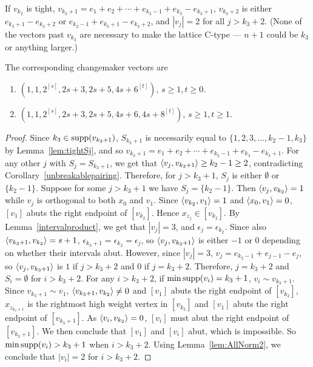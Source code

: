 \begin{prop}\label{2k2>2}
If $v_{k_2}$ is tight, $v_{k_3 + 1} = e_1 + e_2 + \cdots + e_{k_2 - 1} + e_{k_3} - e_{k_3 + 1}$, $v_{k_3 + 2}$ is either $e_{k_3 + 1} - e_{k_3+2}$ or $e_{k_2 - 1} +  e_{k_3 + 1} - e_{k_3+2}$, and $|v_j| = 2$ for all $j > k_3 + 2$. (None of the vectors past $v_{k_3}$ are necessary to make the lattice C-type --- $n+1$ could be $k_3$ or anything larger.)

The corresponding changemaker vectors are
\begin{enumerate}
\item $(1,1,2^{[s]},2s+3,2s+5,4s+6^{[t]})$, $s\ge1,t\ge0$.
\item $(1,1,2^{[s]},2s+3,2s+5,4s+6,4s+8^{[t]})$, $s\ge1,t\ge1$.
\end{enumerate}
\end{prop}
\begin{proof}
Since $k_3 \in \operatorname{supp}(v_{k_3 + 1})$, $S_{k_3 + 1}$ is necessarily equal to $\{1,2,3,\dots,k_2 - 1, k_3\}$ by Lemma~\ref{lem:tightSj}, and so $v_{k_3 + 1} = e_1 + e_2 + \cdots + e_{k_2 - 1} + e_{k_3} - e_{k_3 + 1}$. 
For any other $j$ with $S_j = S_{k_3 + 1}$, we get that $\left\langle v_j , v_{k_3+1} \right\rangle \ge k_2-1\ge2$, contradicting Corollary~\ref{unbreakablepairing}. Therefore, for $j > k_3 + 1$, $S_j$ is either $\emptyset$ or $\{k_2 - 1\}$. Suppose for some $j > k_3 + 1$ we have $S_j = \{k_2 - 1\}$. Then $\left\langle v_j , v_{k_2} \right\rangle = 1$ while $v_j$ is orthogonal to both $x_0$ and $v_1$. Since $\left\langle v_{k_2} , v_1 \right\rangle=1$ and $\left\langle x_0 , v_1 \right\rangle=0$, $[v_1]$ abuts the right endpoint of $[v_{k_2}]$. Hence $x_{z_j} \in [v_{k_2}]$.
By Lemma~\ref{intervalproduct}, we get that $|v_j| = 3$,  and $\epsilon_j = \epsilon_{k_2}$. Since also $\left\langle v_{k_3 +1} , v_{k_2} \right\rangle = s+1$, $\epsilon_{k_3 + 1} = \epsilon_{k_2} = \epsilon_j$, so $\left\langle v_j , v_{k_3 + 1} \right\rangle$ is either $-1$ or $0$ depending on whether their intervals abut. However, since $|v_j| = 3$, $v_j = e_{k_2 - 1} + e_{j-1} - e_j$, so $\left\langle v_j , v_{k_3 + 1} \right\rangle$ is $1$ if $j > k_3 + 2$ and $0$ if $j = k_3 + 2$. Therefore, $j = k_3 + 2$ and $S_i = \emptyset$ for $i > k_3 + 2$. 
For any $i > k_3 + 2$, if $\min\operatorname{supp}(v_i)=k_3+1$, $v_i\sim v_{k_3+1}$. Since $v_{k_3+1}\sim v_1$, $\left\langle v_{k_3+1} , v_{k_2} \right\rangle\ne0$ and $[v_1]$ abuts the right endpoint of $[v_{k_2}]$, $x_{z_{k_3+1}}$ is the rightmost high weight vertex in $[v_{k_2}]$ and $[v_1]$ abuts the right endpoint of  $[v_{k_3+1}]$. As $\left\langle v_i , v_{k_2} \right\rangle=0$, $[v_i]$ must abut the right endpoint of $[v_{k_3+1}]$. We then conclude that $[v_1]$ and $[v_i]$ abut, which is impossible.
 So $\min\operatorname{supp}(v_i)>k_3+1$ when $i > k_3 + 2$.
Using Lemma~\ref{lem:AllNorm2}, we conclude that $|v_i| = 2$ for $i > k_3 + 2$. 
\end{proof}

